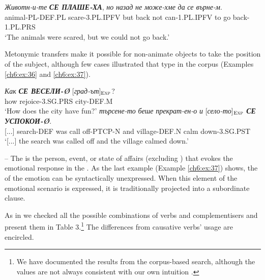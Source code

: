 \documentclass[output=paper,colorlinks,citecolor=brown]{langscibook}
\begin{document}
\begin{exe} 
\ex  \label{ch6:ex:35} 
\gll \textit{Животн-и-те} {\textit{\textbf{СЕ ПЛАШЕ-ХА}}}, {\textit{но}} {\textit{назад}} {\textit{не}} {\textit{може-хме}} {\textit{да}} {\textit{се върне-м}}. \\ 
{animal-PL-DEF.PL} {scare-3.PL.IPFV} {but} {back} {not} {can-1.PL.IPFV} {to} {go back-1.PL.PRS}
\\ %
\glt `The animals were scared, but we could not go back.'
\end{exe}

Metonymic transfers make it possible for non-animate objects to take the position of the subject, although few cases illustrated that type in the corpus (Examples \ref{ch6:ex:36} and \ref{ch6:ex:37}).

\begin{exe} 
\ex  \label{ch6:ex:36} 
\gll \textit{Как} \textit{\textbf{СЕ ВЕСЕЛИ-Ø}} [{\textit{град-ът}}]$_{\text{\textsc{Exp}}}$? \\ 
{how} {rejoice-3.SG.PRS} {city-DEF.M}
\\ %
\glt `How does the city have fun?'
\ex  \label{ch6:ex:37}  
\gll [...] \textit{търсене-то} \textit{беше} \textit{прекрат-ен-о} \textit{и} [{\textit{село-то}}]$_{\text{\textsc{Exp}}}$ \textit{\textbf{СЕ УСПОКОИ-Ø}}. \\ 
{}[...] {search-DEF} {was} {call off-PTCP-N} {and} {village-DEF.N} {calm down-3.SG.PST}
\\ %
\glt `[...] the search was called off and the village calmed down.'
\end{exe}

 -- The  is the person, event, or state of affairs (excluding ) that evokes the emotional response in the . As the last example (Example \ref{ch6:ex:37}) shows, the  of the emotion can be syntactically unexpressed. When this element of the emotional scenario is expressed, it is traditionally projected into a subordinate clause. 

As in  we checked all the possible combinations of verbs and complementisers and present them in Table 3.\footnote{We have documented the results from the corpus-based search, although the values are not always consistent with our own intuition
.} The differences from causative verbs’ usage are encircled.
\end{document}
